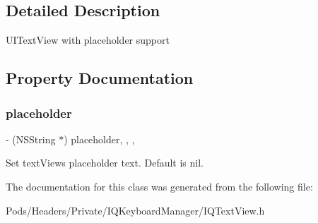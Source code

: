 \subsection{Detailed Description}
U\+I\+Text\+View with placeholder support 

\subsection{Property Documentation}
\mbox{\label{interface_i_q_text_view_a5f79e06d8462c4be8e96954d349907db}} 
\subsubsection{\texorpdfstring{placeholder}{placeholder}}
{\footnotesize\ttfamily -\/ (N\+S\+String $\ast$) placeholder\hspace{0.3cm}{\ttfamily [read]}, {\ttfamily [write]}, {\ttfamily [nonatomic]}, {\ttfamily [copy]}}

Set text\+View\textquotesingle{}s placeholder text. Default is nil. 

The documentation for this class was generated from the following file\+:\begin{DoxyCompactItemize}
\item 
Pods/\+Headers/\+Private/\+I\+Q\+Keyboard\+Manager/I\+Q\+Text\+View.\+h\end{DoxyCompactItemize}
